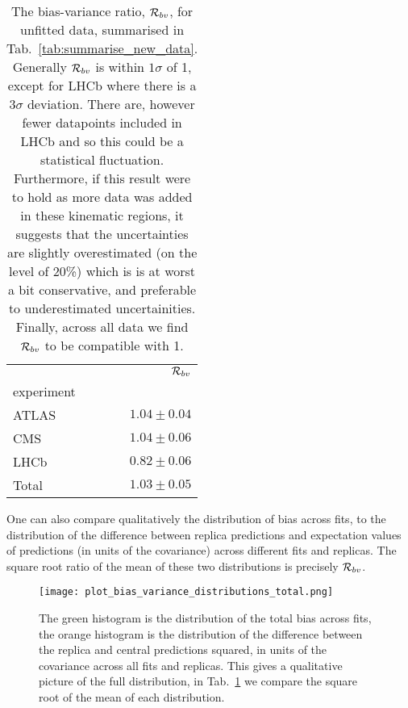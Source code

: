 \begin{table}
    \begin{center}
        \begin{tabular}{lr}
            \toprule
            {} &  $\mathcal{R}_{bv}$ \\
            experiment &                      \\
            \midrule
            ATLAS       &                 $1.04 \pm 0.04$  \\
            CMS         &                 $1.04 \pm 0.06$ \\
            LHCb       &                 $0.82 \pm 0.06$ \\
            Total       &                 $ 1.03 \pm 0.05$ \\
            \bottomrule
        \end{tabular}
    \end{center}
    \caption{
        The bias-variance ratio, $\mathcal{R}_{bv}$, for unfitted data, summarised in
        Tab.~\ref{tab:summarise_new_data}. Generally $\mathcal{R}_{bv}$ is within
        $1\sigma$ of 1, except for LHCb where there is a $3\sigma$ deviation.
        There are, however fewer datapoints included in LHCb and so this could be
        a statistical fluctuation. Furthermore, if this result were to hold as
        more data was added in these kinematic regions, it suggests that the
        uncertainties are slightly overestimated (on the level of 20\%) which is
        is at worst a bit conservative, and preferable to underestimated
        uncertainities. Finally, across all data we find $\mathcal{R}_{bv}$ to
        be compatible with 1.
    }
    \label{tab:biasvarratio}
\end{table}

One can also compare qualitatively the distribution of bias across fits, to the
distribution of the difference between replica predictions and expectation
values of predictions (in units of the covariance) across different fits
and replicas. The square root ratio of the mean of these two distributions
is precisely $\mathcal{R}_{bv}$.

\begin{figure}
    \centering
    \texttt{[image: plot\_bias\_variance\_distributions\_total.png]}
    \caption{The green histogram is the distribution of the total bias across fits,
    the orange histogram is the distribution of the difference between the
    replica and central predictions squared, in units of the covariance
    across all fits and replicas. This gives a qualitative picture of the full
    distribution, in Tab.~\ref{tab:biasvarratio} we compare the square root of the
    mean of each distribution.}
\end{figure}

